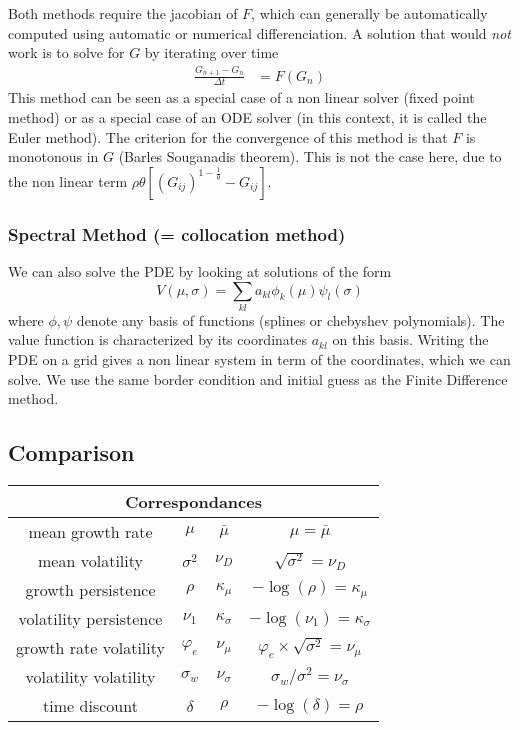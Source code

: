 \documentclass[english]{article}
\begin{document}
Both methods require the jacobian of $F$, which can generally be automatically computed using automatic or numerical differenciation. 
A solution that would \textit{not} work is to solve for $G$ by iterating over time
\begin{align*}
	\frac{G_{n+1}-G_n}{\Delta t} &= F(G_n)
\end{align*}
This method can be seen as a special case of a non linear solver (fixed point method) or as a special case of an ODE solver (in this context, it is called the Euler method). The criterion for the convergence of this method is that $F$ is monotonous in $G$ (Barles Souganadis theorem). This is not the case here, due to the non linear term  $\rho \theta[(G_{ij})^{1-\frac{1}{\theta}}- G_{ij}]$.

\subsubsection{Spectral Method (= collocation method)}
We can also solve the PDE by looking at solutions of the form
$$V(\mu, \sigma) = \sum_{kl} a_{kl} \phi_k(\mu)\psi_l(\sigma)$$
where $\phi, \psi$ denote any basis of functions (splines or chebyshev polynomials).
The value function is characterized by its coordinates $a_{kl}$ on this basis. Writing the PDE on a grid gives a non linear system in term of the coordinates, which we can solve. We use the same border condition and initial guess as the Finite Difference method.

\subsection{Comparison}

\begin{tabular}{|c|c|c|c|}
	\hline 
	\multicolumn{4}{c}{Correspondances}
	\\
	\hline 
	\hline 
	mean growth rate & $\mu$ & $\bar{\mu}$ & $\mu=\bar{\mu}$
	\\
	\hline 
	mean volatility & $\sigma^{2}$ & $\nu_{D}$ & $\sqrt{\sigma^{2}}=\nu_{D}$
	\\
	\hline 
	growth persistence & $\rho$ & $\kappa_{\mu}$ & $ - \log(\rho) = \kappa_\mu$ 
	\\
	\hline 
	volatility persistence & $\nu_{1}$ & $\kappa_{\sigma}$ & $-\log\left(\nu_{1}\right)=\kappa_{\sigma}$
	\\
	\hline 
	growth rate volatility & $\varphi_{e}$ & $\nu_{\mu}$ & $\varphi_{e}\times\sqrt{\sigma^{2}}=\nu_{\mu}$
	\\
	\hline 
	volatility volatility & $\sigma_{w}$ & $\nu_{\sigma}$ & $\sigma_{w}/\sigma^{2}=\nu_{\sigma}$
	\\
	\hline 
	time discount & $\delta$ & $\rho$ & $-\log\left(\delta\right)=\rho$\\
	\hline
\end{tabular}
\end{document}
